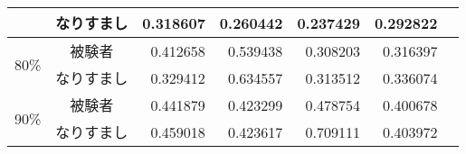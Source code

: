 \begin{center}
\begin{longtable}[btph]{|c|c|r|r|r|r|r|}
           & なりすまし & 0.318607 & 0.260442 & 0.237429 & 0.292822 & \\ \hline
      \multirow{2}{*}{80\%} & 被験者 & 0.412658 & 0.539438 & 0.308203 & 0.316397 & \\ \cline{2-7}
           & なりすまし & 0.329412 & 0.634557 & 0.313512 & 0.336074 & \\ \hline
      \multirow{2}{*}{90\%} & 被験者 & 0.441879 & 0.423299 & 0.478754 & 0.400678 & \\ \cline{2-7}
           & なりすまし & 0.459018 & 0.423617 & 0.709111 & 0.403972 & \\ \hline
  \end{longtable}
\end{center}
